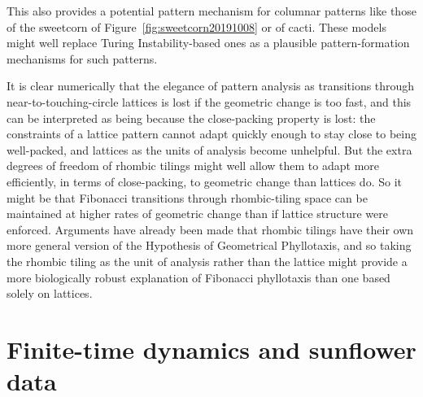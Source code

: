 This also provides a potential pattern mechanism for columnar patterns like those of the sweetcorn of Figure~\ref{fig:sweetcorn20191008} or of cacti. These models might well replace Turing Instability-based ones as a plausible pattern-formation mechanisms for such patterns. 

\clearpage




It is clear numerically that the elegance of pattern analysis as transitions through near-to-touching-circle lattices is lost if the geometric change is too fast, and this can be interpreted as being because the close-packing property is lost: the constraints of a lattice pattern cannot adapt quickly enough to stay close to being well-packed,
and lattices as the units of analysis become unhelpful. 
But the extra degrees of freedom of rhombic tilings might well allow them to adapt more efficiently, in terms of close-packing, to geometric change than lattices do. So it might be that Fibonacci transitions through rhombic-tiling space can be maintained at higher rates of geometric change than if lattice structure were enforced. Arguments have already been made that rhombic tilings have their own more general version of the Hypothesis of Geometrical Phyllotaxis, and so taking the rhombic tiling as the unit of analysis rather than the lattice might provide 
a more biologically robust explanation of Fibonacci phyllotaxis than one based solely on lattices. 
\clearpage
\section{Finite-time dynamics and sunflower data}



